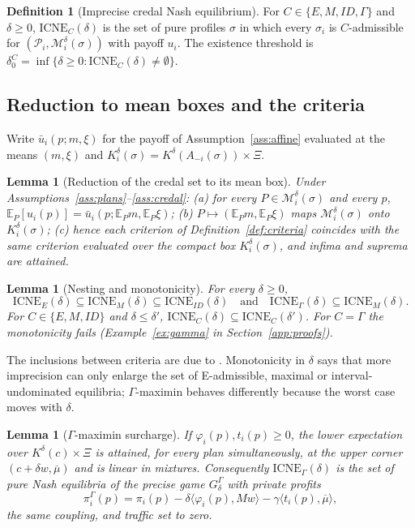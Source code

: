 \documentclass[preprint,11pt]{elsarticle}
\newtheorem{lemma}[theorem]{Lemma}
\theoremstyle{definition}
\newtheorem{definition}[theorem]{Definition}
\theoremstyle{remark}
\newcommand{\E}{\mathbb{E}}
\newcommand{\cP}{\mathcal{P}}
\newcommand{\cM}{\mathcal{M}}
\newcommand{\ub}{\bar u}
\newcommand{\ICNE}{\mathrm{ICNE}}
\newcommand{\ip}[2]{\langle #1,#2\rangle}
\begin{document}
\begin{definition}[Imprecise credal Nash equilibrium]\label{def:icne}
For $C\in\{E,M,ID,\Gamma\}$ and $\delta\ge0$, $\ICNE_C(\delta)$ is the set of pure profiles $\sigma$ in which every $\sigma_i$ is $C$-admissible for $(\cP_i,\cM_i^\delta(\sigma))$ with payoff $u_i$. The existence threshold is $\delta_0^C=\inf\{\delta\ge0:\ICNE_C(\delta)\neq\emptyset\}$.
\end{definition}

\subsection{Reduction to mean boxes and the criteria}

Write $\ub_i(p;m,\xi)$ for the payoff of Assumption~\ref{ass:affine} evaluated at the means $(m,\xi)$ and $K_i^\delta(\sigma)=K^\delta(A_{-i}(\sigma))\times\Xi$.

\begin{lemma}[Reduction of the credal set to its mean box]\label{lem:reduction}
Under Assumptions~\ref{ass:plans}--\ref{ass:credal}: (a) for every $P\in\cM_i^\delta(\sigma)$ and every $p$, $\E_P[u_i(p)]=\ub_i(p;\E_Pm,\E_P\xi)$; (b) $P\mapsto(\E_Pm,\E_P\xi)$ maps $\cM_i^\delta(\sigma)$ onto $K_i^\delta(\sigma)$; (c) hence each criterion of Definition~\ref{def:criteria} coincides with the same criterion evaluated over the compact box $K_i^\delta(\sigma)$, and infima and suprema are attained.
\end{lemma}

\begin{lemma}[Nesting and monotonicity]\label{lem:nesting}
For every $\delta\ge0$, \[\ICNE_E(\delta)\subseteq\ICNE_M(\delta)\subseteq\ICNE_{ID}(\delta)\quad\text{and}\quad\ICNE_\Gamma(\delta)\subseteq\ICNE_M(\delta).\] For $C\in\{E,M,ID\}$ and $\delta\le\delta'$, $\ICNE_C(\delta)\subseteq\ICNE_C(\delta')$. For $C=\Gamma$ the monotonicity fails (Example~\ref{ex:gamma} in Section~\ref{app:proofs}).
\end{lemma}

The inclusions between criteria are due to \citet{Troffaes2007}. Monotonicity in $\delta$ says that more imprecision can only enlarge the set of E-admissible, maximal or interval-undominated equilibria; $\Gamma$-maximin behaves differently because the worst case moves with $\delta$.

\begin{lemma}[$\Gamma$-maximin surcharge]\label{lem:gamma}
If $\varphi_i(p),t_i(p)\ge0$, the lower expectation over $K^\delta(c)\times\Xi$ is attained, for every plan simultaneously, at the upper corner $(c+\delta w,\overline\mu)$ and is linear in mixtures. Consequently $\ICNE_\Gamma(\delta)$ is the set of pure Nash equilibria of the precise game $G^\Gamma_\delta$ with private profits
\[
\pi_i^\Gamma(p)=\pi_i(p)-\delta\ip{\varphi_i(p)}{Mw}-\gamma\ip{t_i(p)}{\overline\mu},
\]
the same coupling, and traffic set to zero.
\end{lemma}
\end{document}
